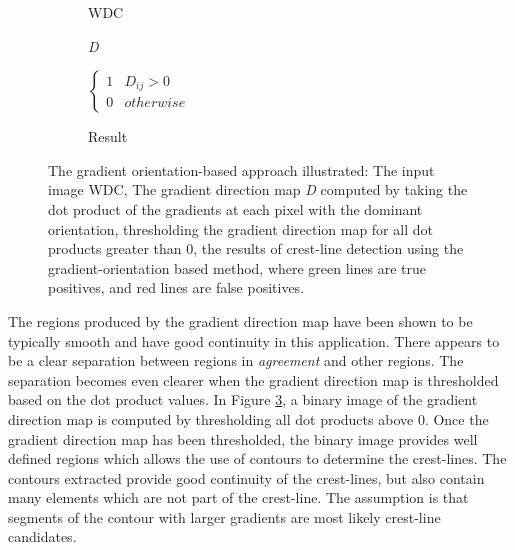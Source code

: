 \begin{figure}
	\centering
	\begin{subfigure}{0.48\textwidth}
		\centering
		\caption{WDC}
		\label{fig:orientation_based_wdc}
	\end{subfigure}
	\begin{subfigure}{0.48\textwidth}
		\centering
		\caption{\emph{D}}
		\label{fig:orientation_based_dot_product}
	\end{subfigure}
	\begin{subfigure}{0.48\textwidth}
		\centering
		\caption{$\begin{cases}
				1 & D_{ij} > 0\\
				0 & otherwise
			\end{cases}$}
		\label{fig:orientation_based_threshold_dot_product}
	\end{subfigure}
	\begin{subfigure}{0.48\textwidth}
		\centering
		\caption{Result}
		\label{fig:orientation_based_results}
	\end{subfigure}
	\caption{The gradient orientation-based approach illustrated:  The input image WDC,  The gradient direction map \emph{D} computed by taking the dot product of the gradients at each pixel with the dominant orientation,  thresholding the gradient direction map for all dot products greater than 0,  the results of crest-line detection using the gradient-orientation based method, where green lines are true positives, and red lines are false positives. }
	\label{fig:orientation_based_process}
\end{figure}

The regions produced by the gradient direction map have been shown to be typically smooth and have good continuity in this application. There appears to be a clear separation between regions in \emph{agreement} and other regions. The separation becomes even clearer when the gradient direction map is thresholded based on the dot product values. In Figure \ref{fig:orientation_based_threshold_dot_product}, a binary image of the gradient direction map is computed by thresholding all dot products above 0. Once the gradient direction map has been thresholded, the binary image provides well defined regions which allows the use of contours to determine the crest-lines. The contours extracted provide good continuity of the crest-lines, but also contain many elements which are not part of the crest-line. The assumption is that segments of the contour with larger gradients are most likely crest-line candidates. 

